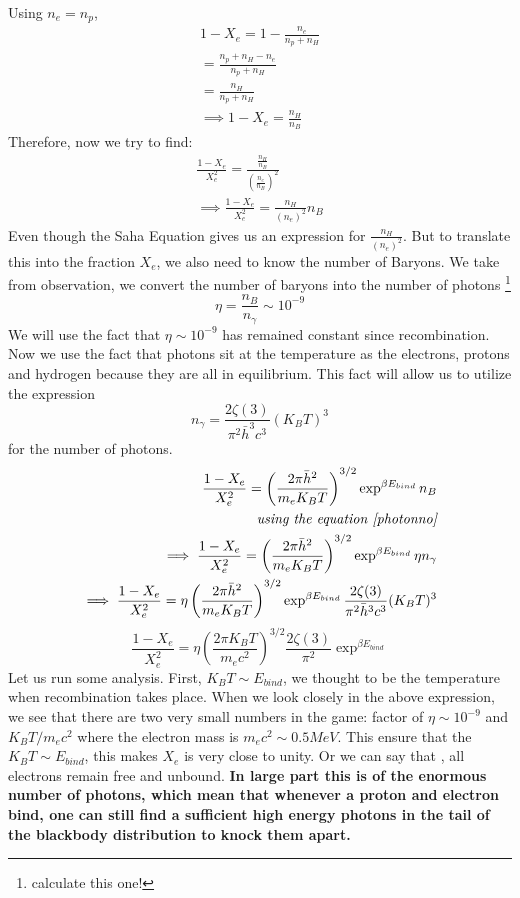 \documentclass[12pt]{report}
\newcommand{\tbf}[1]{\textbf{#1}}
\newcommand{\tit}[1]{\textit{#1}}
\newcommand{\fn}[1]{\footnote{#1}}
\begin{document}
Using $n_e=n_p$, 
\begin{eqnarray*}
1 - X_e= 1- \frac{n_e}{n_p + n_H}\\
=\frac{n_p +n_H - n_e}{n_p+n_H}\\
=\frac{n_H}{n_p+n_H}\\
\implies 1 - X_e=\frac{n_H}{n_B}
\end{eqnarray*}
Therefore, now we try to find:
\begin{eqnarray*}
\frac{1-X_e}{X_e^2}=\frac{\frac{n_H}{n_B}}{\left(\frac{n_e}{n_B}\right)^2}\\
\implies \frac{1-X_e}{X_e^2}=\frac{n_H}{\left(n_e\right)^2}n_B
\end{eqnarray*}
Even though the Saha Equation gives us an expression for $\frac{n_H}{\left(n_e\right)^2}$. But to translate this into the fraction $X_e$, we also need to know the number of Baryons. We take from observation, we convert the number of baryons into the number of photons \fn{calculate this one!}
\begin{equation}
\eta=\frac{n_B}{n_\gamma}\sim 10^{-9}
\end{equation}
We will use the fact that $\eta \sim 10^{-9}$ has remained constant since recombination. Now we use the fact that photons sit at the temperature as the electrons, protons and hydrogen because they are all in equilibrium.  This fact will allow us to utilize the expression 
\begin{equation}\label{photonno}
n_\gamma=\frac{2\zeta(3)}{\pi^2 \bar{h}^3 c^3}(K_BT)^3
\end{equation}
for the number of photons. 
\begin{eqnarray*}
\frac{1-X_e}{X_e^2}=\left(\frac{2 \pi \bar{h}^2}{m_e K_BT}\right)^{3/2}\exp^{\beta E_{bind}} n_B\\
\tit{using the equation \eqref{photonno}}\\
\implies \frac{1-X_e}{X_e^2}=\left(\frac{2 \pi \bar{h}^2}{m_e K_BT}\right)^{3/2}\exp^{\beta E_{bind}} \eta n_\gamma\\
\implies \frac{1-X_e}{X_e^2}=\eta \left(\frac{2 \pi \bar{h}^2}{m_e K_BT}\right)^{3/2}\exp^{\beta E_{bind}}  \frac{2\zeta(3)}{\pi^2 \bar{h}^3 c^3}(K_BT)^3\\
\end{eqnarray*}
\begin{equation}\label{fractionelectroneq}
\frac{1-X_e}{X_e^2}=\eta \left(\frac{2 \pi K_BT}{m_e c^2}\right)^{3/2}  \frac{2\zeta(3)}{\pi^2 } \exp^{\beta E_{bind}}
\end{equation}
Let us run some analysis. First, $K_BT \sim E_{bind}$, we thought to be the temperature when recombination takes place. When we look closely in the above expression, we see that there are two very small numbers in the game: factor of $\eta \sim 10^{-9}$ and $K_BT/m_ec^2$ where the electron mass is $m_ec^2 \sim 0.5MeV$. This ensure that the $K_BT \sim E_{bind}$, this makes $X_e$ is very close to unity. Or we can say that , all electrons remain free and unbound. \tbf{In large part this is of the enormous number of photons, which mean that whenever a proton and electron bind, one can still find a sufficient high energy photons in the tail of the blackbody distribution to knock them apart.}
\end{document}
